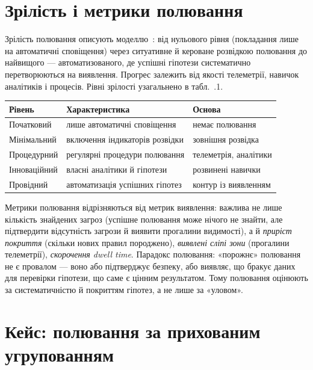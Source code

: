 \section{Зрілість і метрики полювання}\label{sec:ch13-maturity}

Зрілість полювання описують моделлю~\cite{ch13:hunting-maturity}: від нульового рівня (покладання лише на автоматичні сповіщення) через ситуативне й кероване розвідкою полювання до найвищого --- автоматизованого, де успішні гіпотези систематично перетворюються на виявлення. Прогрес залежить від якості телеметрії, навичок аналітиків і процесів. Рівні зрілості узагальнено в табл.~\thechapter.1.


\begin{center}\footnotesize
\begin{tabularx}{\linewidth}{L{16mm} Y L{20mm}}
\toprule
Рівень & Характеристика & Основа \\
\midrule
Початковий & лише автоматичні сповіщення & немає полювання \\
Мінімальний & включення індикаторів розвідки & зовнішня розвідка \\
Процедурний & регулярні процедури полювання & телеметрія, аналітики \\
Інноваційний & власні аналітики й гіпотези & розвинені навички \\
Провідний & автоматизація успішних гіпотез & контур із виявленням \\
\bottomrule
\end{tabularx}
\end{center}


Метрики полювання відрізняються від метрик виявлення: важлива не лише кількість знайдених загроз (успішне полювання може нічого не знайти, але підтвердити відсутність загрози й виявити прогалини видимості), а й \emph{приріст покриття} (скільки нових правил породжено), \emph{виявлені сліпі зони} (прогалини телеметрії), \emph{скорочення dwell time}. Парадокс полювання: «порожнє» полювання не є провалом --- воно або підтверджує безпеку, або виявляє, що бракує даних для перевірки гіпотези, що саме є цінним результатом. Тому полювання оцінюють за систематичністю й покриттям гіпотез, а не лише за «уловом».

\section{Кейс: полювання за прихованим угрупованням}\label{sec:ch13-case}

